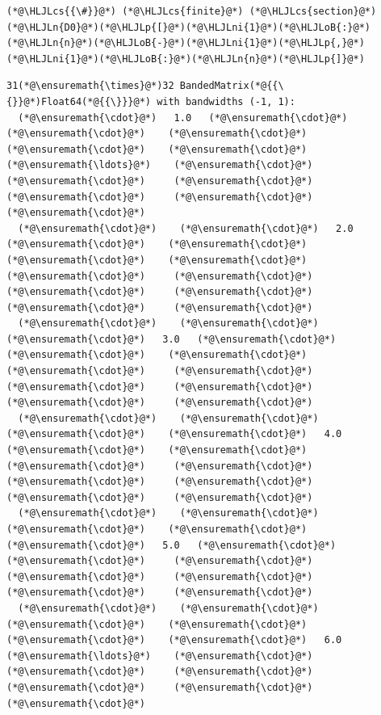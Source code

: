 \documentclass[12pt,a4paper]{article}
\newcommand{\HLJLn}[1]{#1}
\newcommand{\HLJLni}[1]{\textcolor[RGB]{59,151,46}{#1}}
\newcommand{\HLJLoB}[1]{\textcolor[RGB]{102,102,102}{\textbf{#1}}}
\newcommand{\HLJLp}[1]{#1}
\newcommand{\HLJLcs}[1]{\textcolor[RGB]{153,153,119}{\textit{#1}}}
\begin{document}
\begin{lstlisting}
(*@\HLJLcs{{\#}}@*) (*@\HLJLcs{finite}@*) (*@\HLJLcs{section}@*)
(*@\HLJLn{D0}@*)(*@\HLJLp{[}@*)(*@\HLJLni{1}@*)(*@\HLJLoB{:}@*)(*@\HLJLn{n}@*)(*@\HLJLoB{-}@*)(*@\HLJLni{1}@*)(*@\HLJLp{,}@*)(*@\HLJLni{1}@*)(*@\HLJLoB{:}@*)(*@\HLJLn{n}@*)(*@\HLJLp{]}@*)
\end{lstlisting}

\begin{lstlisting}
31(*@\ensuremath{\times}@*)32 BandedMatrix(*@{{\{}}@*)Float64(*@{{\}}}@*) with bandwidths (-1, 1):
  (*@\ensuremath{\cdot}@*)   1.0   (*@\ensuremath{\cdot}@*)    (*@\ensuremath{\cdot}@*)    (*@\ensuremath{\cdot}@*)    (*@\ensuremath{\cdot}@*)    (*@\ensuremath{\cdot}@*)   (*@\ensuremath{\ldots}@*)    (*@\ensuremath{\cdot}@*)     (*@\ensuremath{\cdot}@*)     (*@\ensuremath{\cdot}@*)     (*@\ensuremath{\cdot}@*)     (*@\ensuremath{\cdot}@*)     (*@\ensuremath{\cdot}@*) 
  (*@\ensuremath{\cdot}@*)    (*@\ensuremath{\cdot}@*)   2.0   (*@\ensuremath{\cdot}@*)    (*@\ensuremath{\cdot}@*)    (*@\ensuremath{\cdot}@*)    (*@\ensuremath{\cdot}@*)        (*@\ensuremath{\cdot}@*)     (*@\ensuremath{\cdot}@*)     (*@\ensuremath{\cdot}@*)     (*@\ensuremath{\cdot}@*)     (*@\ensuremath{\cdot}@*)     (*@\ensuremath{\cdot}@*) 
  (*@\ensuremath{\cdot}@*)    (*@\ensuremath{\cdot}@*)    (*@\ensuremath{\cdot}@*)   3.0   (*@\ensuremath{\cdot}@*)    (*@\ensuremath{\cdot}@*)    (*@\ensuremath{\cdot}@*)        (*@\ensuremath{\cdot}@*)     (*@\ensuremath{\cdot}@*)     (*@\ensuremath{\cdot}@*)     (*@\ensuremath{\cdot}@*)     (*@\ensuremath{\cdot}@*)     (*@\ensuremath{\cdot}@*) 
  (*@\ensuremath{\cdot}@*)    (*@\ensuremath{\cdot}@*)    (*@\ensuremath{\cdot}@*)    (*@\ensuremath{\cdot}@*)   4.0   (*@\ensuremath{\cdot}@*)    (*@\ensuremath{\cdot}@*)        (*@\ensuremath{\cdot}@*)     (*@\ensuremath{\cdot}@*)     (*@\ensuremath{\cdot}@*)     (*@\ensuremath{\cdot}@*)     (*@\ensuremath{\cdot}@*)     (*@\ensuremath{\cdot}@*) 
  (*@\ensuremath{\cdot}@*)    (*@\ensuremath{\cdot}@*)    (*@\ensuremath{\cdot}@*)    (*@\ensuremath{\cdot}@*)    (*@\ensuremath{\cdot}@*)   5.0   (*@\ensuremath{\cdot}@*)        (*@\ensuremath{\cdot}@*)     (*@\ensuremath{\cdot}@*)     (*@\ensuremath{\cdot}@*)     (*@\ensuremath{\cdot}@*)     (*@\ensuremath{\cdot}@*)     (*@\ensuremath{\cdot}@*) 
  (*@\ensuremath{\cdot}@*)    (*@\ensuremath{\cdot}@*)    (*@\ensuremath{\cdot}@*)    (*@\ensuremath{\cdot}@*)    (*@\ensuremath{\cdot}@*)    (*@\ensuremath{\cdot}@*)   6.0  (*@\ensuremath{\ldots}@*)    (*@\ensuremath{\cdot}@*)     (*@\ensuremath{\cdot}@*)     (*@\ensuremath{\cdot}@*)     (*@\ensuremath{\cdot}@*)     (*@\ensuremath{\cdot}@*)     (*@\ensuremath{\cdot}@*) 

\end{lstlisting}
\end{document}

